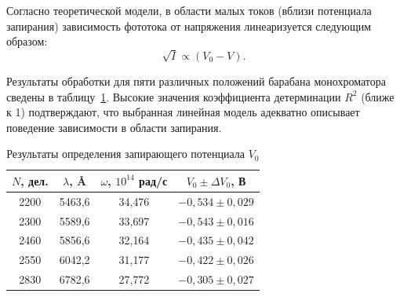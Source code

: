 \documentclass[12pt, a4paper]{article}
\begin{document}
Согласно теоретической модели, в области малых токов (вблизи потенциала запирания) зависимость фототока от напряжения линеаризуется следующим образом:
\begin{equation}
    \sqrt{I} \propto (V_0 - V).
\end{equation}


Результаты обработки для пяти различных положений барабана монохроматора сведены в таблицу~\ref{tab:v0_results}. Высокие значения коэффициента детерминации $R^2$ (ближе к 1) подтверждают, что выбранная линейная модель адекватно описывает поведение зависимости в области запирания.

\begin{table}[H]
\centering
\caption{Результаты определения запирающего потенциала $V_0$}
\label{tab:v0_results}
\renewcommand{\arraystretch}{1.3}
\begin{tabular}{|c|c|c|c|}
\hline
$N$, дел. & $\lambda$, \AA & $\omega$, $10^{14}$ рад/с & $V_0 \pm \Delta V_0$, В \\
\hline
2200 & 5463{,}6 & 34{,}476 & $-0{,}534 \pm 0{,}029$ \\
2300 & 5589{,}6 & 33{,}697 & $-0{,}543 \pm 0{,}016$ \\
2460 & 5856{,}6 & 32{,}164 & $-0{,}435 \pm 0{,}042$ \\
2550 & 6042{,}2 & 31{,}177 & $-0{,}422 \pm 0{,}026$ \\
2830 & 6782{,}6 & 27{,}772 & $-0{,}305 \pm 0{,}027$ \\
\hline
\end{tabular}
\end{table}
\end{document}
